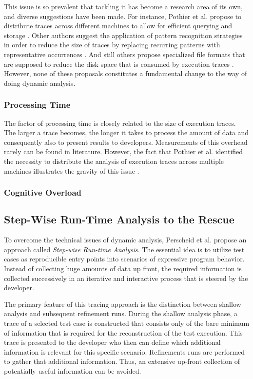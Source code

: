 This issue is so prevalent that tackling it has become a research area of its own, and diverse suggestions have been made.
For instance, Pothier et al. propose to distribute traces across different machines to allow for efficient querying and storage \cite{pothier_scalable_2007}.
Other authors suggest the application of pattern recognition strategies in order to reduce the size of traces by replacing recurring patterns with representative occurrences .
And still others propose specialized file formats that are supposed to reduce the disk space that is consumed by execution traces .
However, none of these proposals constitutes a fundamental change to the way of doing dynamic analysis.

\subsubsection{Processing Time}
The factor of processing time is closely related to the size of execution traces.
The larger a trace becomes, the longer it takes to process the amount of data and consequently also to present results to developers.
Measurements of this overhead rarely can be found in literature.
However, the fact that Pothier et al. identified the necessity to distribute the analysis of execution traces across multiple machines illustrates the gravity of this issue \cite{pothier_scalable_2007}.

\subsubsection{Cognitive Overload}

\subsection{Step-Wise Run-Time Analysis to the Rescue}
\label{ss:ApproachTracing}
To overcome the technical issues of dynamic analysis, Perscheid et al. propose an approach called \emph{Step-wise Run-time Analysis}.
The essential idea is to utilize test cases as reproducible entry points into scenarios of expressive program behavior.
Instead of collecting huge amounts of data up front, the required information is collected successively in an iterative and interactive process that is steered by the developer.

The primary feature of this tracing approach is the distinction between shallow analysis and subsequent refinement runs.
During the shallow analysis phase, a trace of a selected test case is constructed that consists only of the bare minimum of information that is required for the reconstruction of the test execution.
This trace is presented to the developer who then can define which additional information is relevant for this specific scenario.
Refinements runs are performed to gather that additional information.
Thus, an extensive up-front collection of potentially useful information can be avoided.

